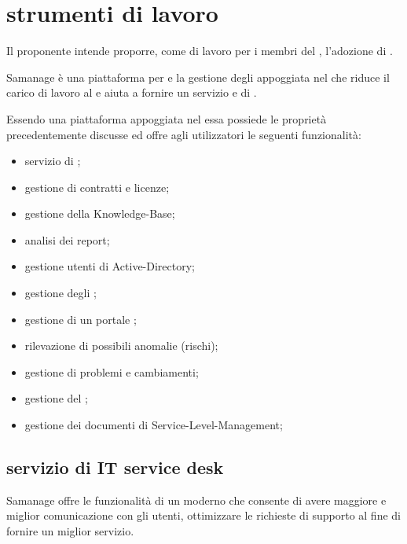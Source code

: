 %
%
\section[Strumenti di lavoro]{strumenti di lavoro}
\label{sd-tools}
Il proponente intende proporre, come  di lavoro per i membri del , l'adozione di .

Samanage è una piattaforma per  e la gestione degli  appoggiata nel  che riduce il carico di lavoro al  e aiuta a fornire un servizio  e di .

Essendo una piattaforma appoggiata nel  essa possiede le proprietà precedentemente discusse ed offre agli utilizzatori le seguenti funzionalità:

\begin{itemize}
\item{servizio di ;}
\item{gestione di contratti e licenze;}
\item{gestione della \ac{Knowledge-Base};}
\item{analisi dei report;}
\item{gestione utenti di \ac{Active-Directory};}
\item{gestione degli ;}
\item{gestione di un portale ;}
\item{rilevazione di possibili anomalie (rischi);}
\item{gestione di problemi e cambiamenti;}
\item{gestione del ;}
\item{gestione dei documenti di \ac{Service-Level-Management};}
\end{itemize}

\subsection[Servizio di IT Service Desk]{servizio di IT service desk}
\label{sd-samanage-sd-service}
Samanage offre le funzionalità di un moderno  che consente di avere maggiore e miglior comunicazione con gli utenti, ottimizzare le richieste di supporto al fine di fornire un miglior servizio.

